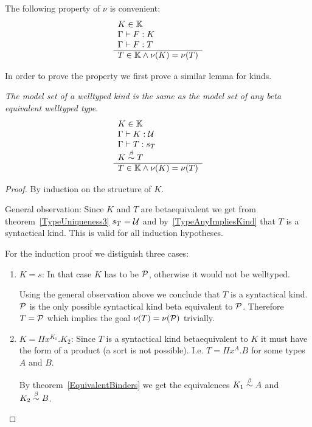 The following property of $\nu$ is convenient:
$$
    \begin{array}{l} 
        K \in \mathbb{K}
        \\
        \Gamma \vdash F: K
        \\
        \Gamma \vdash F: T
     \\ \hline 
        T \in \mathbb{K} \land \nu(K) = \nu(T)
    \end{array}
$$


In order to prove the property we first prove a similar lemma for kinds.

\begin{lemma}
    \label{ModelEquivalentKinds}
    \emph{The model set of a welltyped kind is the same as the model set of any beta
    equivalent welltyped type}.
    $$
    \begin{array}{l} 
        K \in \mathbb{K}
        \\
        \Gamma \vdash K: {\cal U}
        \\
        \Gamma \vdash T: s_T
        \\
        K \stackrel{\beta}{\sim} T
     \\ \hline 
        T \in \mathbb{K} \land \nu(K) = \nu(T)
    \end{array}
    $$

    \begin{proof}
        By induction on the structure of $K$.

        General observation: Since $K$ and $T$ are betaequivalent we get from
        theorem~\ref{TypeUniqueness3} $s_T = {\cal U}$ and
        by~\ref{TypeAnyImpliesKind} that $T$ is a syntactical kind. This is
        valid for all induction hypotheses.

        For the induction proof we distiguish three cases:
        \begin{enumerate}
        \item $K = s$: In that case $K$ has to be ${\cal P}$, otherwise it would
            not be welltyped.

            Using the general observation above we conclude that
            $T$ is a syntactical kind. ${\cal P}$ is the only possible syntactical
                kind beta equivalent to ${\cal P}$. Therefore $T = {\cal P}$ which
                implies the goal $\nu(T) = \nu({\cal P})$ trivially.

        \item $K = \Pi x^{K_1}. K_2$:
            Since $T$ is a syntactical kind betaequivalent to $K$ it must have
                the form of a product (a sort is not possible). I.e. $T = \Pi
                x^A.B$ for some types $A$ and $B$.

            By theorem~\ref{EquivalentBinders} we get the equivalences $K_1
                \stackrel{\beta}{\sim} A$ and $K_2 \stackrel{\beta}{\sim} B$.


\end{enumerate}
\end{proof}
\end{lemma}
